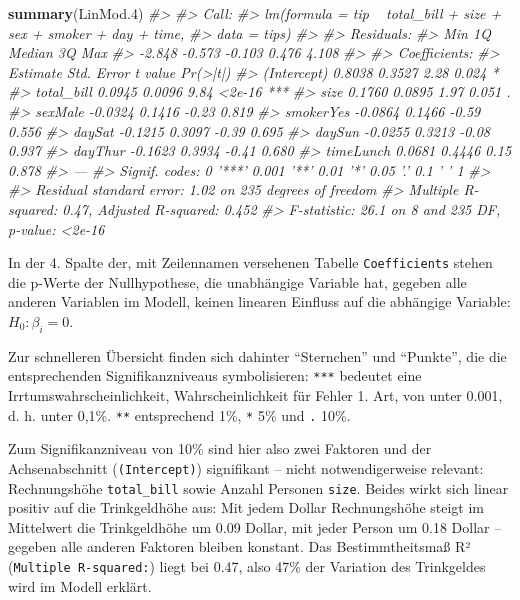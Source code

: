 \documentclass[12pt,ngerman,]{book}
\makeatletter
\newenvironment{Shaded}{\begin{snugshade}}{\end{snugshade}}
\newcommand{\KeywordTok}[1]{\textcolor[rgb]{0.13,0.29,0.53}{\textbf{{#1}}}}
\newcommand{\FloatTok}[1]{\textcolor[rgb]{0.00,0.00,0.81}{{#1}}}
\newcommand{\CommentTok}[1]{\textcolor[rgb]{0.56,0.35,0.01}{\textit{{#1}}}}
\newcommand{\NormalTok}[1]{{#1}}
\newenvironment{kframe}{%
\medskip{}
\setlength{\fboxsep}{.8em}
 \def\at@end@of@kframe{}%
 \ifinner\ifhmode%
  \def\at@end@of@kframe{\end{minipage}}%
  \begin{minipage}{\columnwidth}%
 \fi\fi%
 \def\FrameCommand##1{\hskip\@totalleftmargin \hskip-\fboxsep
 \colorbox{shadecolor}{##1}\hskip-\fboxsep
     \hskip-\linewidth \hskip-\@totalleftmargin \hskip\columnwidth}%
 \MakeFramed {\advance\hsize-\width
   \@totalleftmargin\z@ \linewidth\hsize
   \@setminipage}}%
 {\par\unskip\endMakeFramed%
 \at@end@of@kframe}
\renewenvironment{Shaded}{\begin{kframe}}{\end{kframe}}
\makeatother
\begin{document}
\begin{Shaded}
\begin{Highlighting}[]
\KeywordTok{summary}\NormalTok{(LinMod}\FloatTok{.4}\NormalTok{)}
\CommentTok{#> }
\CommentTok{#> Call:}
\CommentTok{#> lm(formula = tip ~ total_bill + size + sex + smoker + day + time, }
\CommentTok{#>     data = tips)}
\CommentTok{#> }
\CommentTok{#> Residuals:}
\CommentTok{#>    Min     1Q Median     3Q    Max }
\CommentTok{#> -2.848 -0.573 -0.103  0.476  4.108 }
\CommentTok{#> }
\CommentTok{#> Coefficients:}
\CommentTok{#>             Estimate Std. Error t value Pr(>|t|)    }
\CommentTok{#> (Intercept)   0.8038     0.3527    2.28    0.024 *  }
\CommentTok{#> total_bill    0.0945     0.0096    9.84   <2e-16 ***}
\CommentTok{#> size          0.1760     0.0895    1.97    0.051 .  }
\CommentTok{#> sexMale      -0.0324     0.1416   -0.23    0.819    }
\CommentTok{#> smokerYes    -0.0864     0.1466   -0.59    0.556    }
\CommentTok{#> daySat       -0.1215     0.3097   -0.39    0.695    }
\CommentTok{#> daySun       -0.0255     0.3213   -0.08    0.937    }
\CommentTok{#> dayThur      -0.1623     0.3934   -0.41    0.680    }
\CommentTok{#> timeLunch     0.0681     0.4446    0.15    0.878    }
\CommentTok{#> ---}
\CommentTok{#> Signif. codes:  0 '***' 0.001 '**' 0.01 '*' 0.05 '.' 0.1 ' ' 1}
\CommentTok{#> }
\CommentTok{#> Residual standard error: 1.02 on 235 degrees of freedom}
\CommentTok{#> Multiple R-squared:  0.47,   Adjusted R-squared:  0.452 }
\CommentTok{#> F-statistic: 26.1 on 8 and 235 DF,  p-value: <2e-16}
\end{Highlighting}
\end{Shaded}

In der 4. Spalte der, mit Zeilennamen versehenen Tabelle
\texttt{Coefficients} stehen die p-Werte der Nullhypothese, die
unabhängige Variable hat, gegeben alle anderen Variablen im Modell,
keinen linearen Einfluss auf die abhängige Variable: \(H_0: \beta_i=0\).

Zur schnelleren Übersicht finden sich dahinter ``Sternchen'' und
``Punkte'', die die entsprechenden Signifikanzniveaus symbolisieren:
\texttt{***} bedeutet eine Irrtumswahrscheinlichkeit, Wahrscheinlichkeit
für Fehler 1. Art, von unter 0.001, d. h. unter 0,1\%. \texttt{**}
entsprechend 1\%, \texttt{*} 5\% und \texttt{.} 10\%.

Zum Signifikanzniveau von 10\% sind hier also zwei Faktoren und der
Achsenabschnitt (\texttt{(Intercept)}) signifikant -- nicht
notwendigerweise relevant: Rechnungshöhe \texttt{total\_bill} sowie
Anzahl Personen \texttt{size}. Beides wirkt sich linear positiv auf die
Trinkgeldhöhe aus: Mit jedem Dollar Rechnungshöhe steigt im Mittelwert
die Trinkgeldhöhe um 0.09 Dollar, mit jeder Person um 0.18 Dollar --
gegeben alle anderen Faktoren bleiben konstant. Das Bestimmtheitsmaß R²
(\texttt{Multiple\ R-squared:}) liegt bei 0.47, also 47\% der Variation
des Trinkgeldes wird im Modell erklärt.
\end{document}
